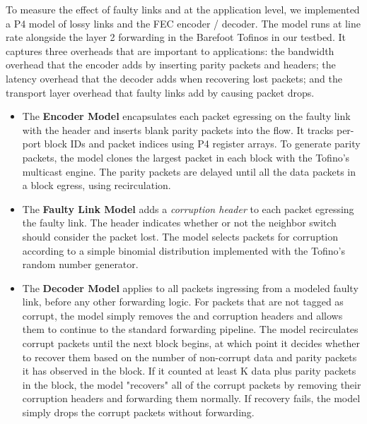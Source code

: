 To measure the effect of faulty links and
\OurSys at the application level, we implemented a P4 model of lossy links and
the FEC encoder / decoder. The model runs at line  rate alongside the layer 2
forwarding in the Barefoot Tofinos in our  testbed. It captures three
overheads that are important to applications: the bandwidth overhead that the
encoder adds by inserting parity packets and \OurSys headers; the latency
overhead that the decoder adds when recovering lost packets; and the transport
layer overhead that faulty links add by causing packet drops.

\begin{itemize}

\item The \textbf{Encoder Model} encapsulates each packet  egressing on the
faulty link with the \OurSys header and inserts blank  parity packets into the
flow. It tracks per-port block IDs and  packet indices using P4 register
arrays. To generate parity packets, the  model clones the largest packet in
each block with the Tofino's multicast engine. The parity packets are 
delayed until all the data packets in a block egress, using recirculation. 


\item The \textbf{Faulty Link Model} adds a \emph{corruption header} to each packet
egressing the faulty link. The header indicates whether or not the neighbor
switch should consider the packet lost. The model selects packets for corruption
according to a simple binomial distribution implemented with the Tofino's
random number generator.

\item The \textbf{Decoder Model} applies to all packets ingressing from a
modeled faulty link, before any other forwarding logic. For packets that are
not tagged as corrupt, the model simply removes the \OurSys and corruption headers and
allows them to continue to the standard forwarding  pipeline. The model
recirculates corrupt packets until the next block begins, at which point it
decides whether  to recover them based on the number of non-corrupt data and
parity packets it has  observed in the block.  If it counted at least K data
plus parity packets  in the block, the model "recovers" all of the corrupt
packets by removing their corruption headers and forwarding them normally. If
recovery fails, the model simply drops the corrupt packets without forwarding.

\end{itemize}

